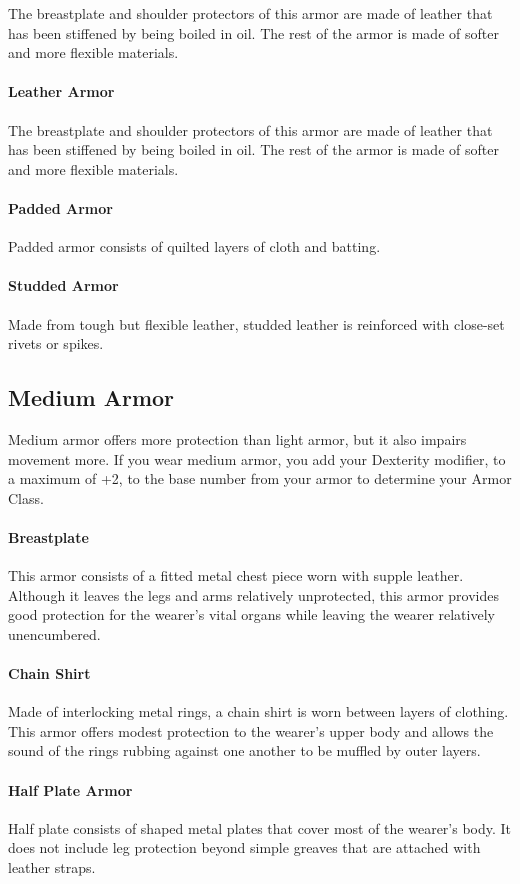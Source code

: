         The breastplate and shoulder protectors of this armor are made of leather that has been stiffened by being boiled in oil.
        The rest of the armor is made of softer and more flexible materials.
    \paragraph{Leather Armor}
        The breastplate and shoulder protectors of this armor are made of leather that has been stiffened by being boiled in oil.
        The rest of the armor is made of softer and more flexible materials.
    \paragraph{Padded Armor}
        Padded armor consists of quilted layers of cloth and batting.
    \paragraph{Studded Armor}
        Made from tough but flexible leather, studded leather is reinforced with close-set rivets or spikes.
\subsection*{Medium Armor} \label{ssec::mediumarmor}
    Medium armor offers more protection than light armor, but it also impairs movement more.
    If you wear medium armor, you add your Dexterity modifier, to a maximum of +2, to the base number from your armor to determine your Armor Class.

    \paragraph{Breastplate}
        This armor consists of a fitted metal chest piece worn with supple leather.
        Although it leaves the legs and arms relatively unprotected, this armor provides good protection for the wearer's vital organs while leaving the wearer relatively unencumbered.
    \paragraph{Chain Shirt}
        Made of interlocking metal rings, a chain shirt is worn between layers of clothing.
        This armor offers modest protection to the wearer's upper body and allows the sound of the rings rubbing against one another to be muffled by outer layers.
    \paragraph{Half Plate Armor}
        Half plate consists of shaped metal plates that cover most of the wearer's body.
        It does not include leg protection beyond simple greaves that are attached with leather straps.
